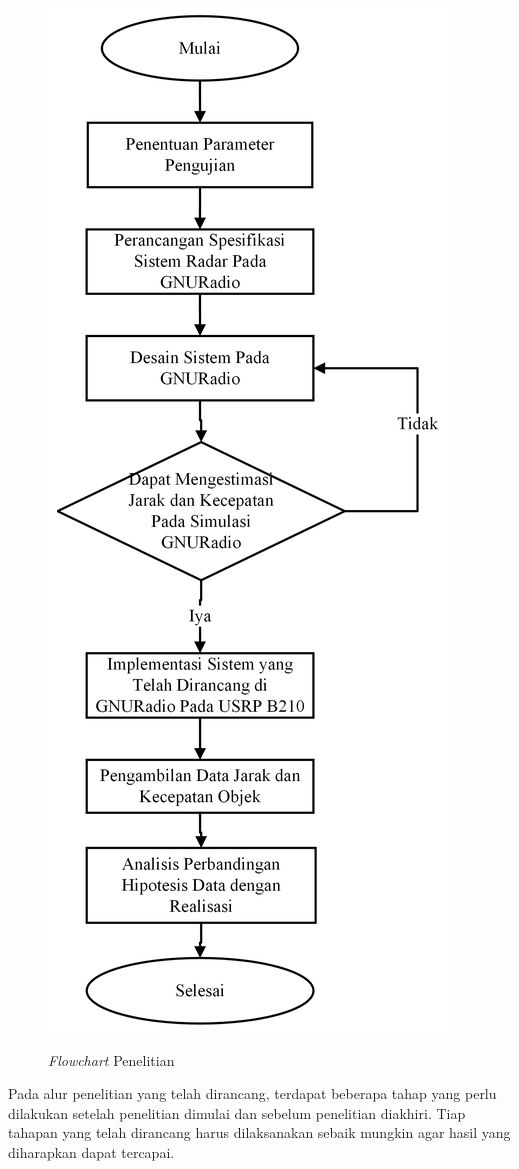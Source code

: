  \begin{figure}
	\begin{center}
		\includegraphics[scale=0.53]{pics/bab3/FlowchartTugasAkhir.png} 
		\label{img:flowchart}
		\caption[\textit{Flowchart} Penelitian]{\textit{Flowchart} Penelitian}
	\end{center}
\end{figure}
Pada alur penelitian yang telah dirancang, terdapat beberapa tahap yang perlu dilakukan setelah penelitian dimulai dan sebelum penelitian diakhiri. Tiap tahapan yang telah dirancang harus dilaksanakan sebaik mungkin agar hasil yang diharapkan dapat tercapai.
	
